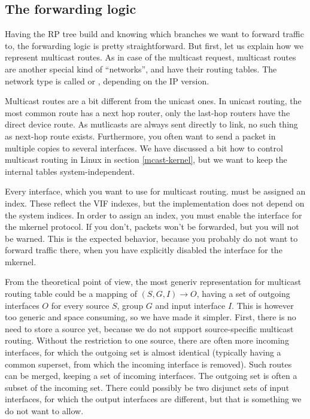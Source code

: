 \subsection{The forwarding logic}
Having the RP tree build and knowing which branches we want to forward traffic
to, the forwarding logic is pretty straightforward. But first, let us explain
how we represent multicast routes. As in case of the multicast request,
multicast routes are another special kind of ``networks'', and have their
routing tables. The network type is called  or ,
depending on the IP version.

Multicast routes are a bit different from the unicast ones. In unicast routing,
the most common route has a next hop router, only the last-hop routers have the
direct device route. As mutlicasts are always sent directly to link, no such
thing as next-hop route exists. Furthermore, you often want to send a packet in
multiple copies to several interfaces. We have discussed a bit how to control
multicast routing in Linux in section \ref{mcast-kernel}, but we want to keep
the internal tables system-independent.

Every interface, which you want to use for multicast routing. must be assigned
an index. These reflect the VIF indexes, but the implementation does not depend
on the system indices. In order to assign an index, you must enable the
interface for the mkernel protocol. If you don't, packets won't be
forwarded, but you will not be warned. This is the expected behavior, because
you probably do not want to forward traffic there, when you have explicitly
disabled the interface for the mkernel.

From the theoretical point of view, the most generiv representation for
multicast routing table could be a mapping of $(S, G, I) \rightarrow O$,
having a set of outgoing interfaces $O$ for every source $S$, group $G$ and
input interface $I$. This is however too generic and space consuming, so we
have made it simpler. First, there is no need to store a source yet, because we
do not support source-specific multicast routing. Without the restriction to
one source, there are often more incoming interfaces, for which the outgoing
set is almost identical (typically having a common superset, from which the
incoming interface is removed). Such routes can be merged, keeping a set of
incoming interfaces. The outgoing set is often a subset of the incoming set.
There could possibly be two disjunct sets of input interfaces, for which the
output interfaces are different, but that is something we do not want to allow.


